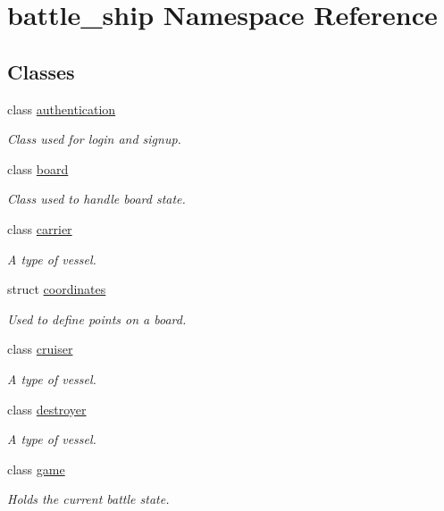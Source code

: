 \hypertarget{namespacebattle__ship}{}\section{battle\+\_\+ship Namespace Reference}
\label{namespacebattle__ship}
\subsection*{Classes}
\begin{DoxyCompactItemize}
\item 
class \hyperlink{classbattle__ship_1_1authentication}{authentication}
\begin{DoxyCompactList}\small\item\em Class used for login and signup. \end{DoxyCompactList}\item 
class \hyperlink{classbattle__ship_1_1board}{board}
\begin{DoxyCompactList}\small\item\em Class used to handle board state. \end{DoxyCompactList}\item 
class \hyperlink{classbattle__ship_1_1carrier}{carrier}
\begin{DoxyCompactList}\small\item\em A type of vessel. \end{DoxyCompactList}\item 
struct \hyperlink{structbattle__ship_1_1coordinates}{coordinates}
\begin{DoxyCompactList}\small\item\em Used to define points on a board. \end{DoxyCompactList}\item 
class \hyperlink{classbattle__ship_1_1cruiser}{cruiser}
\begin{DoxyCompactList}\small\item\em A type of vessel. \end{DoxyCompactList}\item 
class \hyperlink{classbattle__ship_1_1destroyer}{destroyer}
\begin{DoxyCompactList}\small\item\em A type of vessel. \end{DoxyCompactList}\item 
class \hyperlink{classbattle__ship_1_1game}{game}
\begin{DoxyCompactList}\small\item\em Holds the current battle state. \end{DoxyCompactList}\item 

\end{DoxyCompactItemize}
